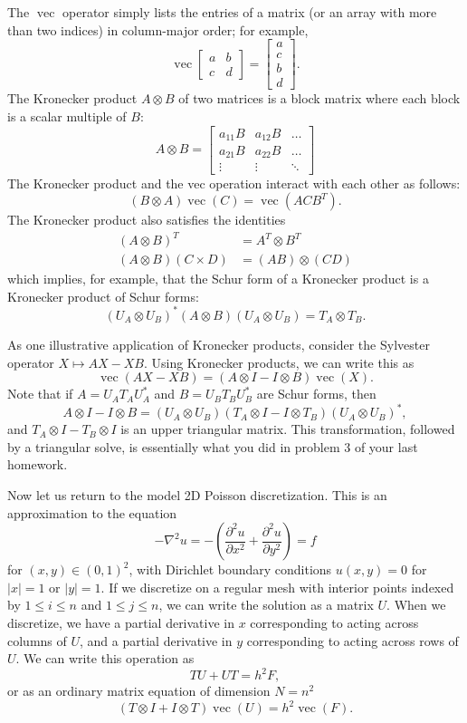 \documentclass[12pt, leqno]{article} %
\begin{document}
The $\operatorname{vec}$ operator simply lists the entries of a matrix (or an
array with more than two indices) in column-major order; for example,
\[
  \operatorname{vec} \begin{bmatrix} a & b \\ c & d \end{bmatrix} =
  \begin{bmatrix} a \\ c \\ b \\ d \end{bmatrix}.
\]
The Kronecker product $A \otimes B$ of two matrices is a block matrix
where each block is a scalar multiple of $B$:
\[
  A \otimes B =
  \begin{bmatrix}
    a_{11} B & a_{12} B & \ldots \\
    a_{21} B & a_{22} B & \ldots \\
    \vdots & \vdots & \ddots
  \end{bmatrix}
\]
The Kronecker product and the vec operation interact with each other
as follows:
\[
  (B \otimes A) \operatorname{vec}(C) = \operatorname{vec}(ACB^T).
\]
The Kronecker product also satisfies the identities
\begin{align*}
  (A \otimes B)^T &= A^T \otimes B^T \\
  (A \otimes B) (C \times D) &= (AB) \otimes (CD)
\end{align*}
which implies, for example, that the Schur form of a Kronecker product
is a Kronecker product of Schur forms:
\[
  (U_A \otimes U_B)^* (A \otimes B) (U_A \otimes U_B)= T_A \otimes T_B.
\]

As one illustrative application of Kronecker products, consider the
Sylvester operator $X \mapsto AX-XB$.  Using Kronecker products, we
can write this as
\[
  \operatorname{vec}(AX-XB) =
  (A \otimes I - I \otimes B) \operatorname{vec}(X).
\]
Note that if $A = U_A T_A U_A^*$ and $B = U_B T_B U_B^*$ are Schur
forms, then
\[
  A \otimes I - I \otimes B =
  (U_A \otimes U_B) (T_A \otimes I - I \otimes T_B) (U_A \otimes U_B)^*,
\]
and $T_A \otimes I - T_B \otimes I$ is an upper triangular matrix.
This transformation, followed by a triangular solve, is essentially
what you did in problem 3 of your last homework.

Now let us return to the model 2D Poisson discretization.  This is an
approximation to the equation
\[
  -\nabla^2 u =
  -\left(
  \frac{\partial^2 u}{\partial x^2}+
  \frac{\partial^2 u}{\partial y^2} \right)
  = f
\]
for $(x,y) \in (0,1)^2$, with Dirichlet boundary conditions $u(x,y) =
0$ for $|x| = 1$ or $|y| = 1$.  If we discretize on a regular mesh with
interior points indexed by $1 \leq i \leq n$ and $1 \leq j \leq n$,
we can write the solution as a matrix $U$.  When we discretize, we
have a partial derivative in $x$ corresponding to acting across
columns of $U$, and a partial derivative in $y$ corresponding to
acting across rows of $U$.  We can write this operation as
\[
  TU + UT = h^2 F,
\]
or as an ordinary matrix equation of dimension $N = n^2$
\[
  (T \otimes I + I \otimes T) \operatorname{vec}(U) = h^2 \operatorname{vec}(F).
\]
\end{document}
